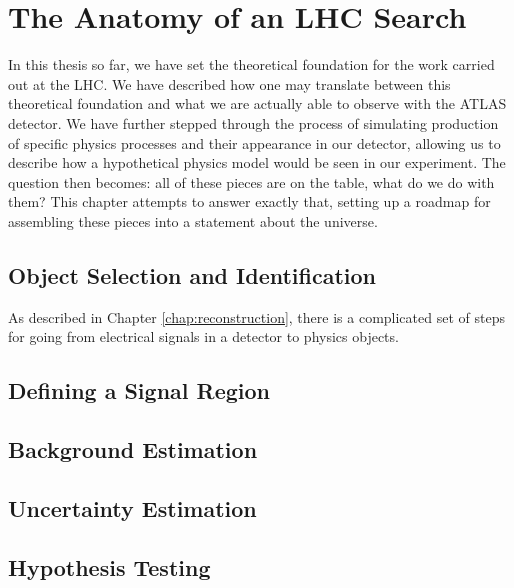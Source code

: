 \chapter{The Anatomy of an LHC Search}
\label{chap:search-outline}

In this thesis so far, we have set the theoretical foundation for the work 
carried out at the LHC. We have described how one may translate between this 
theoretical foundation and what we are actually able to observe with the ATLAS 
detector. We have further stepped through the process of simulating production of 
specific physics processes and their appearance in our detector, allowing us to 
describe how a hypothetical physics model would be seen in our experiment. The question 
then becomes: all of these pieces are on the table, what do we do with them? This chapter
attempts to answer exactly that, setting up a roadmap for assembling these pieces into 
a statement about the universe.

\section{Object Selection and Identification}
As described in Chapter \ref{chap:reconstruction}, there is a complicated set of steps for 
going from electrical signals in a detector to physics objects.

\section{Defining a Signal Region}
\section{Background Estimation}
\section{Uncertainty Estimation}
\section{Hypothesis Testing}
